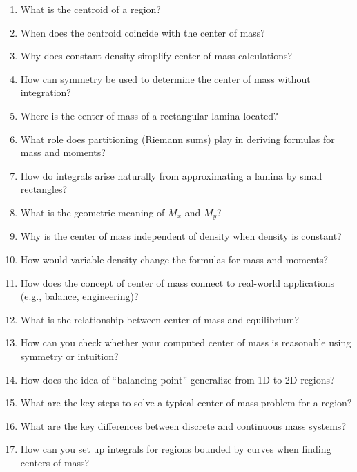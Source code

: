 \begin{enumerate}
  \item What is the centroid of a region?
  \item When does the centroid coincide with the center of mass?
  \item Why does constant density simplify center of mass calculations?
  \item How can symmetry be used to determine the center of mass without integration?
  \item Where is the center of mass of a rectangular lamina located?
  \item What role does partitioning (Riemann sums) play in deriving formulas for mass and moments?
  \item How do integrals arise naturally from approximating a lamina by small rectangles?
  \item What is the geometric meaning of \(M_{x}\) and \(M_{y}\)?
  \item Why is the center of mass independent of density when density is constant?
  \item How would variable density change the formulas for mass and moments?
  \item How does the concept of center of mass connect to real-world applications (e.g., balance, engineering)?
  \item What is the relationship between center of mass and equilibrium?
  \item How can you check whether your computed center of mass is reasonable using symmetry or intuition?
  \item How does the idea of “balancing point” generalize from 1D to 2D regions?
  \item What are the key steps to solve a typical center of mass problem for a region?
  \item What are the key differences between discrete and continuous mass systems?
  \item How can you set up integrals for regions bounded by curves when finding centers of mass?
\end{enumerate}
